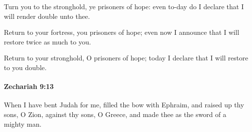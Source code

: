 			\begin{versebox}
					\item[BHS] 
					\item[LXX] 
					\item[ASV] Turn you to the stronghold, ye prisoners of hope: even to-day do I declare that I will render double unto thee.
					\item[NIV] Return to your fortress, you prisoners of hope; even now I announce that I will restore twice as much to you.
					\item[NRSV] Return to your stronghold, O prisoners of hope; today I declare that I will restore to you double.
			\end{versebox}

		\paragraph{Zechariah 9:13} %
			\label{ZECHARIAH-9-13}

			When I have bent Judah for me, filled the bow with Ephraim, and raised up thy sons, O Zion, against thy sons, O Greece, and made thee as the sword of a mighty man.

